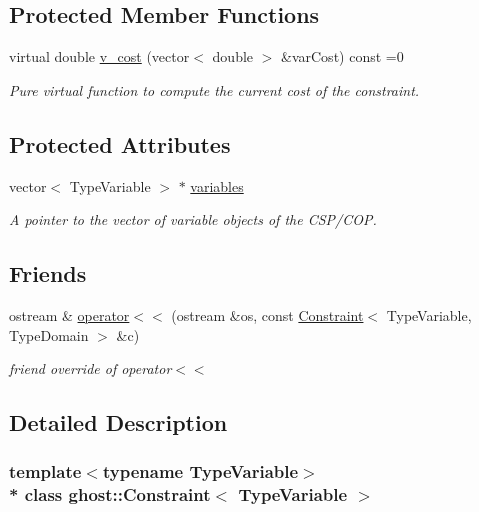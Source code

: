 \subsection*{Protected Member Functions}
\begin{DoxyCompactItemize}
\item 
virtual double \hyperlink{classghost_1_1Constraint_a945f30a69e837136803ce722dffb30db}{v\+\_\+cost} (vector$<$ double $>$ \&var\+Cost) const =0
\begin{DoxyCompactList}\small\item\em Pure virtual function to compute the current cost of the constraint. \end{DoxyCompactList}\end{DoxyCompactItemize}
\subsection*{Protected Attributes}
\begin{DoxyCompactItemize}
\item 
vector$<$ Type\+Variable $>$ $\ast$ \hyperlink{classghost_1_1Constraint_a83305933e19440f42428da0726261c4a}{variables}
\begin{DoxyCompactList}\small\item\em A pointer to the vector of variable objects of the C\+S\+P/\+C\+OP. \end{DoxyCompactList}\end{DoxyCompactItemize}
\subsection*{Friends}
\begin{DoxyCompactItemize}
\item 
ostream \& \hyperlink{classghost_1_1Constraint_a5fb3db9a0881ff7aae65d680386277f0}{operator$<$$<$} (ostream \&os, const \hyperlink{classghost_1_1Constraint}{Constraint}$<$ Type\+Variable, Type\+Domain $>$ \&c)
\begin{DoxyCompactList}\small\item\em friend override of operator$<$$<$ \end{DoxyCompactList}\end{DoxyCompactItemize}


\subsection{Detailed Description}
\subsubsection*{template$<$typename Type\+Variable$>$\\*
class ghost\+::\+Constraint$<$ Type\+Variable $>$}


